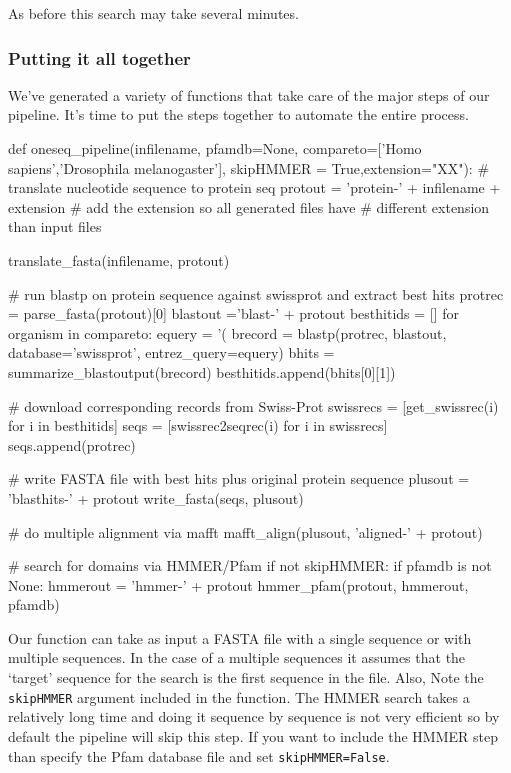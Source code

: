 \documentclass[10pt,letterpaper]{scrartcl}
\begin{document}
As before this search may take several minutes.


\subsubsection*{Putting it all together}

We've generated a variety of functions that take care of the major steps of our pipeline. It's time to put the steps together to automate the entire process. 

\begin{python}
def oneseq_pipeline(infilename, pfamdb=None,
                    compareto=['Homo sapiens','Drosophila melanogaster'],
                    skipHMMER = True,extension="XX"):
    # translate nucleotide sequence to protein seq
    protout = 'protein-' + infilename + extension     
                # add the extension so all generated files have
                # different extension than input files
                
    translate_fasta(infilename, protout)
    
    # run blastp on protein sequence against swissprot and extract best hits
    protrec = parse_fasta(protout)[0]        
    blastout ='blast-' + protout        
    besthitids = []
    for organism in compareto:
        equery = '(%
        brecord = blastp(protrec, blastout, database='swissprot', entrez_query=equery)
        bhits = summarize_blastoutput(brecord)
        besthitids.append(bhits[0][1])

    # download corresponding records from Swiss-Prot
    swissrecs = [get_swissrec(i) for i in besthitids]
    seqs = [swissrec2seqrec(i) for i in swissrecs]
    seqs.append(protrec)    
    
    # write FASTA file with best hits plus original protein sequence
    plusout = 'blasthits-' + protout
    write_fasta(seqs, plusout)     
    
    # do multiple alignment via mafft
    mafft_align(plusout, 'aligned-' + protout)

    # search for domains via HMMER/Pfam     
    if not skipHMMER:  
        if pfamdb is not None: 
            hmmerout = 'hmmer-' + protout
            hmmer_pfam(protout, hmmerout, pfamdb)

\end{python}

Our function can take as input a FASTA file with a single sequence or with multiple sequences. In the case of a multiple sequences it assumes that the `target' sequence for the search is the first sequence in the file. Also, Note the \verb=skipHMMER= argument included in the function. The HMMER search takes a relatively long time and doing it sequence by sequence is not very efficient so by default the pipeline will skip this step. If you want to include the HMMER step than specify the Pfam database file and set \verb~skipHMMER=False~.
\end{document}
